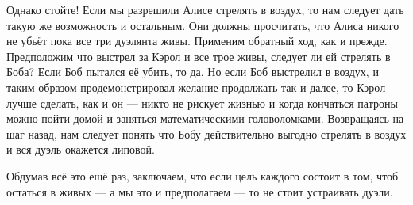Однако стойте!
Если мы разрешили Алисе стрелять в воздух, то нам следует дать такую же возможность и остальным. 
Они должны просчитать, что Алиса никого не убьёт пока все три дуэлянта живы. 
Применим обратный ход, как и прежде.
Предположим что выстрел за Кэрол и все трое живы,
следует ли ей стрелять в Боба? 
Если Боб пытался её убить, то да.
Но если Боб выстрелил в воздух, и таким образом продемонстрировал желание продолжать так и далее,
то Кэрол лучше сделать, как и он ---
никто не рискует жизнью и когда кончаться патроны можно пойти домой и заняться математическими головоломками.
Возвращаясь на шаг назад, нам следует понять что Бобу действительно выгодно стрелять в воздух и вся дуэль окажется липовой.

Обдумав всё это ещё раз, заключаем, что если цель каждого состоит в том, чтоб остаться в живых --- а мы это и предполагаем --- то не стоит устраивать дуэли.
\heart


